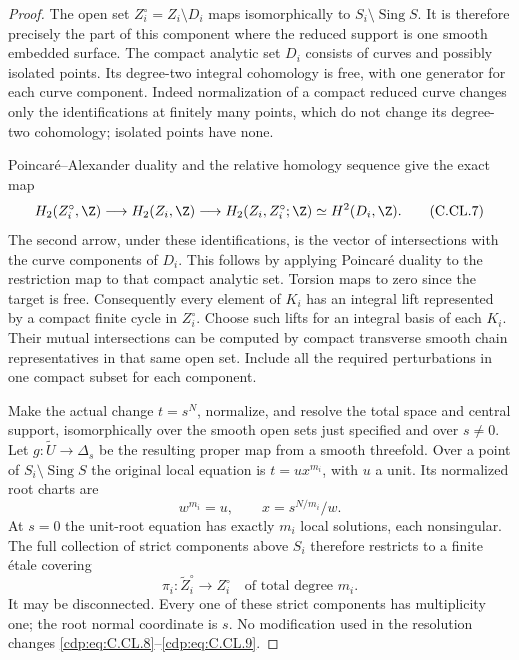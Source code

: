 \begin{proof}
The open set
$Z_i^\circ=Z_i\setminus D_i$ maps isomorphically
to $S_i\setminus\operatorname{Sing}S$. It is
therefore precisely the part of this component
where the reduced support is one smooth embedded
surface. The compact analytic set $D_i$ consists
of curves and possibly isolated points. Its
degree-two integral cohomology is free, with
one generator for each curve component. Indeed
normalization of a compact reduced curve changes
only the identifications at finitely many points,
which do not change its degree-two cohomology;
isolated points have none.

Poincar\'e--Alexander duality and the relative
homology sequence give the exact map
\[
 H_2(Z_i^\circ,\Z)\longrightarrow H_2(Z_i,\Z)
 \longrightarrow H_2(Z_i,Z_i^\circ;\Z)
       \simeq H^2(D_i,\Z).                          \tag{C.CL.7}\label{cdp:eq:C.CL.7}
\]
The second arrow, under these identifications,
is the vector of intersections with the curve
components of $D_i$. This follows by applying
Poincar\'e duality to the restriction map to
that compact analytic set. Torsion maps to
zero since the target is free. Consequently
every element of $K_i$ has an integral lift
represented by a compact finite cycle in
$Z_i^\circ$. Choose such lifts for an integral
basis of each $K_i$. Their mutual intersections
can be computed by compact transverse smooth
chain representatives in that same open set.
Include all the required perturbations in
one compact subset for each component.

Make the actual change $t=s^N$, normalize,
and resolve the total space and central support,
isomorphically over the smooth open sets just
specified and over $s\ne0$. Let
$g:\widetilde U\to\Delta_s$ be the resulting
proper map from a smooth threefold. Over a
point of $S_i\setminus\operatorname{Sing}S$
the original local equation is
$t=u x^{m_i}$, with $u$ a unit. Its normalized
root charts are
\[
       w^{m_i}=u,\qquad x=s^{N/m_i}/w.               \tag{C.CL.8}\label{cdp:eq:C.CL.8}
\]
At $s=0$ the unit-root equation has exactly
$m_i$ local solutions, each nonsingular.
The full collection of strict components
above $S_i$ therefore restricts to a finite
\'etale covering
\[
        \pi_i:\widetilde Z_i^\circ
                       \longrightarrow Z_i^\circ
                  \quad\text{of total degree }m_i.  \tag{C.CL.9}\label{cdp:eq:C.CL.9}
\]
It may be disconnected. Every one of these
strict components has multiplicity one;
the root normal coordinate is $s$.
No modification used in the resolution
changes \eqref{cdp:eq:C.CL.8}--\eqref{cdp:eq:C.CL.9}.


\end{proof}
